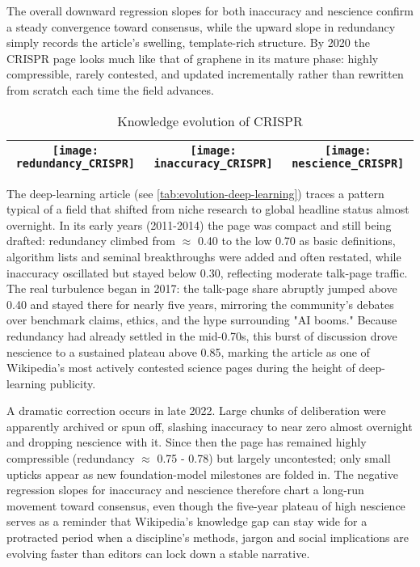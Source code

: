 The overall downward regression slopes for both inaccuracy and nescience confirm a steady convergence toward consensus, while the upward slope in redundancy simply records the article's swelling, template-rich structure. By 2020 the CRISPR page looks much like that of graphene in its mature phase: highly compressible, rarely contested, and updated incrementally rather than rewritten from scratch each time the field advances.

\begin{table}
\begin{centering}
\begin{tabular}{|c|c|c|}
\hline 
\texttt{[image: redundancy\_CRISPR]}
&
\texttt{[image: inaccuracy\_CRISPR]}
&
\texttt{[image: nescience\_CRISPR]}\tabularnewline
\hline 
\end{tabular}
\par\end{centering}
\caption{\label{tab:evolution-CRISPR}Knowledge evolution of CRISPR}
\end{table}

The deep-learning article (see \ref{tab:evolution-deep-learning}) traces a pattern typical of a field that shifted from niche research to global headline status almost overnight. In its early years (2011-2014) the page was compact and still being drafted: redundancy climbed from  $\approx$ 0.40 to the low 0.70 as basic definitions, algorithm lists and seminal breakthroughs were added and often restated, while inaccuracy oscillated but stayed below 0.30, reflecting moderate talk-page traffic. The real turbulence began in 2017: the talk-page share abruptly jumped above 0.40 and stayed there for nearly five years, mirroring the community's debates over benchmark claims, ethics, and the hype surrounding "AI booms." Because redundancy had already settled in the mid-0.70s, this burst of discussion drove nescience to a sustained plateau above 0.85, marking the article as one of Wikipedia's most actively contested science pages during the height of deep-learning publicity.

A dramatic correction occurs in late 2022. Large chunks of deliberation were apparently archived or spun off, slashing inaccuracy to near zero almost overnight and dropping nescience with it. Since then the page has remained highly compressible (redundancy $\approx$ 0.75 - 0.78) but largely uncontested; only small upticks appear as new foundation-model milestones are folded in. The negative regression slopes for inaccuracy and nescience therefore chart a long-run movement toward consensus, even though the five-year plateau of high nescience serves as a reminder that Wikipedia's knowledge gap can stay wide for a protracted period when a discipline's methods, jargon and social implications are evolving faster than editors can lock down a stable narrative.


